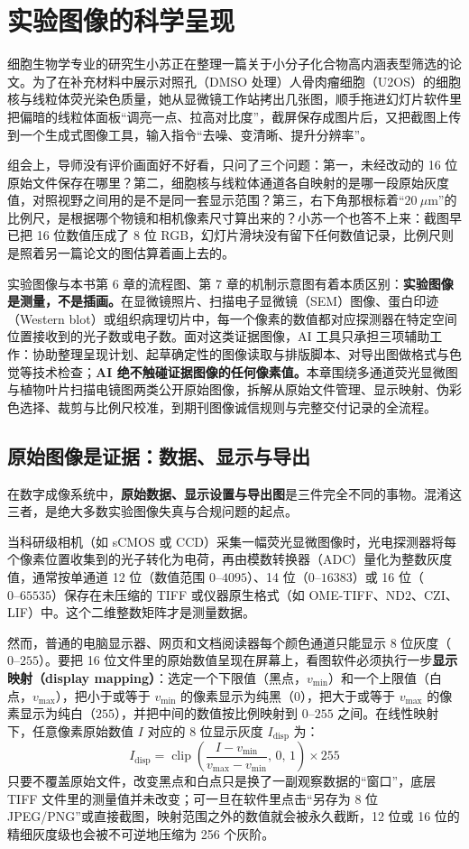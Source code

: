 \chapter{实验图像的科学呈现}

细胞生物学专业的研究生小苏正在整理一篇关于小分子化合物高内涵表型筛选的论文。为了在补充材料中展示对照孔（DMSO 处理）人骨肉瘤细胞（U2OS）的细胞核与线粒体荧光染色质量，她从显微镜工作站拷出几张图，顺手拖进幻灯片软件里把偏暗的线粒体面板“调亮一点、拉高对比度”，截屏保存成图片后，又把截图上传到一个生成式图像工具，输入指令“去噪、变清晰、提升分辨率”。

组会上，导师没有评价画面好不好看，只问了三个问题：第一，未经改动的 16 位原始文件保存在哪里？第二，细胞核与线粒体通道各自映射的是哪一段原始灰度值，对照视野之间用的是不是同一套显示范围？第三，右下角那根标着“$20\ \mu\text{m}$”的比例尺，是根据哪个物镜和相机像素尺寸算出来的？小苏一个也答不上来：截图早已把 16 位数值压成了 8 位 RGB，幻灯片滑块没有留下任何数值记录，比例尺则是照着另一篇论文的图估算着画上去的。

实验图像与本书第 6 章的流程图、第 7 章的机制示意图有着本质区别：\textbf{实验图像是测量，不是插画。}在显微镜照片、扫描电子显微镜（SEM）图像、蛋白印迹（Western blot）或组织病理切片中，每一个像素的数值都对应探测器在特定空间位置接收到的光子数或电子数。面对这类证据图像，AI 工具只承担三项辅助工作：协助整理呈现计划、起草确定性的图像读取与排版脚本、对导出图做格式与色觉等技术检查；\textbf{AI 绝不触碰证据图像的任何像素值。}本章围绕多通道荧光显微图与植物叶片扫描电镜图两类公开原始图像，拆解从原始文件管理、显示映射、伪彩色选择、裁剪与比例尺校准，到期刊图像诚信规则与完整交付记录的全流程。

\section{原始图像是证据：数据、显示与导出}

在数字成像系统中，\textbf{原始数据、显示设置与导出图}是三件完全不同的事物。混淆这三者，是绝大多数实验图像失真与合规问题的起点。

当科研级相机（如 sCMOS 或 CCD）采集一幅荧光显微图像时，光电探测器将每个像素位置收集到的光子转化为电荷，再由模数转换器（ADC）量化为整数灰度值，通常按单通道 12 位（数值范围 $0\text{--}4095$）、14 位（$0\text{--}16383$）或 16 位（$0\text{--}65535$）保存在未压缩的 TIFF 或仪器原生格式（如 OME-TIFF、ND2、CZI、LIF）中。这个二维整数矩阵才是测量数据。

然而，普通的电脑显示器、网页和文档阅读器每个颜色通道只能显示 8 位灰度（$0\text{--}255$）。要把 16 位文件里的原始数值呈现在屏幕上，看图软件必须执行一步\textbf{显示映射（display mapping）}：选定一个下限值（黑点，$v_{\min}$）和一个上限值（白点，$v_{\max}$），把小于或等于 $v_{\min}$ 的像素显示为纯黑（$0$），把大于或等于 $v_{\max}$ 的像素显示为纯白（$255$），并把中间的数值按比例映射到 $0\text{--}255$ 之间。在线性映射下，任意像素原始数值 $I$ 对应的 8 位显示灰度 $I_{\text{disp}}$ 为：
\[
I_{\text{disp}} = \operatorname{clip}\!\left(\frac{I - v_{\min}}{v_{\max} - v_{\min}},\, 0,\, 1\right) \times 255
\]
只要不覆盖原始文件，改变黑点和白点只是换了一副观察数据的“窗口”，底层 TIFF 文件里的测量值并未改变；可一旦在软件里点击“另存为 8 位 JPEG/PNG”或直接截图，映射范围之外的数值就会被永久截断，12 位或 16 位的精细灰度级也会被不可逆地压缩为 256 个灰阶。

